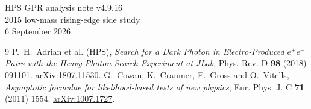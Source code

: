 \documentclass[11pt]{article}
\begin{document}
\begin{center}{\Large HPS GPR analysis note v4.9.16}\\[3pt]
{\large 2015 low-mass rising-edge side study}\\[3pt]6 September 2026\end{center}

\begin{thebibliography}{9}
 P.~H.~Adrian et al. (HPS), \emph{Search for a Dark Photon in Electro-Produced $e^+e^-$ Pairs with the Heavy Photon Search Experiment at JLab}, Phys. Rev. D \textbf{98} (2018) 091101. \href{https://arxiv.org/abs/1807.11530}{arXiv:1807.11530}.
 G.~Cowan, K.~Cranmer, E.~Gross and O.~Vitells, \emph{Asymptotic formulae for likelihood-based tests of new physics}, Eur. Phys. J. C \textbf{71} (2011) 1554. \href{https://arxiv.org/abs/1007.1727}{arXiv:1007.1727}.
\end{thebibliography}
\end{document}
